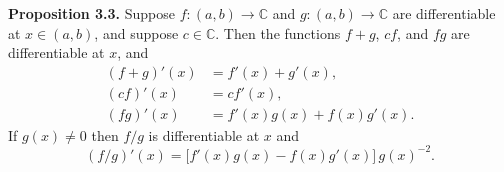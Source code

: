 \textbf{Proposition 3.3.} Suppose $f: (a, b) \to \mathbb{C}$ and $g: (a, b) \to \mathbb{C}$ are differentiable at $x \in (a, b)$, and suppose $c \in \mathbb{C}$. Then the functions $f + g$, $cf$, and $fg$ are differentiable at $x$, and
\begin{align*}
(f + g)'(x) &= f'(x) + g'(x),\\
(cf)'(x) &= c f'(x),\\
(fg)'(x) &= f'(x)g(x) + f(x)g'(x).
\end{align*}
If $g(x) \neq 0$ then $f/g$ is differentiable at $x$ and
$$(f/g)'(x) = \bigl[f'(x)g(x) - f(x)g'(x)\bigr]\,g(x)^{-2}.$$
